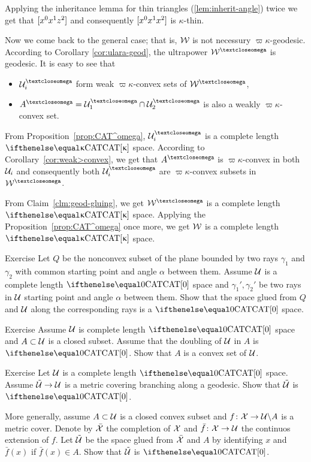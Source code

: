 Applying the inheritance lemma for thin triangles (\ref{lem:inherit-angle}) twice 
we get that $[{x^0}{x^1}{z^2}]$ 
and consequently $[{x^0}{x^1}{x^2}]$ is $\kappa$-thin.
\claimqeds

Now we come back to the general case;
that is, $\mathcal{W}$ is not necessury $\varpi\kappa$-geodesic.
According to Corollary \ref{cor:ulara-geod},
the ultrapower $\spc{W}^\o$ is geodesic.
It is easy to see that 
\begin{itemize}
\item $\spc{U}_i^\o$ form weak $\varpi\kappa$-convex sets of $\spc{W}^\o$,
\item $A^\o=\spc{U}_1^\o\cap\spc{U}_2^\o$ is also a weakly $\varpi\kappa$-convex set.
\end{itemize}
From Proposition~\ref{prop:CAT^omega}, $\spc{U}_i^\o$ is a complete length $\CAT\kappa$ space.
According to Corollary~\ref{cor:weak>convex}, 
we get that $A^\o$ is $\varpi\kappa$-convex in both $\mathcal{U}_i$ and
consequently both $\spc{U}_i^\o$ are $\varpi\kappa$-convex subsets in $\spc{W}^\o$.

From Claim~\ref{clm:geod-gluing}, 
we get $\spc{W}^\o$ is a complete length $\CAT\kappa$ space.
Applying the Proposition~\ref{prop:CAT^omega} once more, 
we get $\mathcal{W}$ is a complete length $\CAT\kappa$ space.
\qeds 

\begin{thm}{Exercise}\label{ex:two-rays}
Let $Q$ be the nonconvex subset of the plane 
bounded by two rays $\gamma_1$ and $\gamma_2$
with common starting point and angle $\alpha$ between them.
Assume $\mathcal{U}$ is a complete length $\CAT0$ space
and $\gamma_1',\gamma_2'$ be two rays in $\mathcal{U}$
starting point and angle $\alpha$ between them.
Show that the space glued from $Q$ and $\mathcal{U}$ along the corresponding rays is a $\CAT{0}$ space.
\end{thm}

\begin{thm}{Exercise}\label{ex:reshetnyak-doubling}
Assume $\mathcal{U}$ is complete length $\CAT0$ space and $A\subset \spc{U}$ is a closed subset.
Assume that the doubling of $\mathcal{U}$ in $A$ is $\CAT0$. 
Show that $A$ is a convex set of $\mathcal{U}$.
\end{thm}

\begin{thm}{Exercise} Let $\mathcal{U}$ is a complete length $\CAT0$ space.
Assume $\tilde{\spc{U}}\to \spc{U}$ is a metric covering branching along a geodesic.
Show that $\tilde{\mathcal{U}}$ is $\CAT0$.

More generally, assume $A\subset \spc{U}$ is a closed convex subset and $f\:\spc{X}\to \spc{U}\backslash A$ is a metric cover.
Denote by $\bar{\mathcal{X}}$ the completion of $\mathcal{X}$ and 
$\bar f\:\spc{X}\to \spc{U}$ the continuos extension of $f$.
Let $\tilde{\mathcal{U}}$ be the space glued from $\bar{\mathcal{X}}$ and $A$ by identifying $x$ and $\bar f(x)$ if $\bar f(x)\in A$.
Show that $\tilde{\mathcal{U}}$ is $\CAT0$.
\end{thm}



